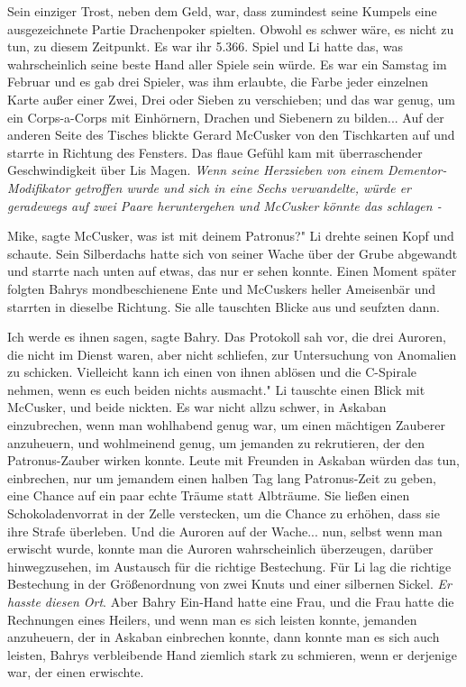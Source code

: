 Sein einziger Trost, neben dem Geld, war, dass zumindest seine Kumpels eine
ausgezeichnete Partie Drachenpoker spielten. Obwohl es schwer wäre, es nicht zu
tun, zu diesem Zeitpunkt. Es war ihr 5.366. Spiel und Li hatte das, was
wahrscheinlich seine beste Hand aller Spiele sein würde. Es war ein Samstag im
Februar und es gab drei Spieler, was ihm erlaubte, die Farbe jeder einzelnen
Karte außer einer Zwei, Drei oder Sieben zu verschieben; und das war genug, um
ein Corps-a-Corps mit Einhörnern, Drachen und Siebenern zu bilden... Auf der
anderen Seite des Tisches blickte Gerard McCusker von den Tischkarten auf und
starrte in Richtung des Fensters. Das flaue Gefühl kam mit überraschender
Geschwindigkeit über Lis Magen. \emph{Wenn seine Herzsieben von einem
Dementor-Modifikator getroffen wurde und sich in eine Sechs verwandelte, würde
er geradewegs auf zwei Paare heruntergehen und McCusker könnte das schlagen -}

\glqq{}Mike\grqq{}, sagte McCusker, \glqq{}was ist mit deinem Patronus?" Li drehte
seinen Kopf und schaute. Sein Silberdachs hatte sich von seiner Wache über der
Grube abgewandt und starrte nach unten auf etwas, das nur er sehen konnte. Einen
Moment später folgten Bahrys mondbeschienene Ente und McCuskers heller
Ameisenbär und starrten in dieselbe Richtung. Sie alle tauschten Blicke aus und
seufzten dann.

\glqq{}Ich werde es ihnen sagen,\grqq{} sagte Bahry. Das Protokoll sah vor, die
drei Auroren, die nicht im Dienst waren, aber nicht schliefen, zur Untersuchung
von Anomalien zu schicken. \glqq{}Vielleicht kann ich einen von ihnen ablösen und
die C-Spirale nehmen, wenn es euch beiden nichts ausmacht." Li tauschte einen
Blick mit McCusker, und beide nickten. Es war nicht allzu schwer, in Askaban
einzubrechen, wenn man wohlhabend genug war, um einen mächtigen Zauberer
anzuheuern, und wohlmeinend genug, um jemanden zu rekrutieren, der den
Patronus-Zauber wirken konnte. Leute mit Freunden in Askaban würden das tun,
einbrechen, nur um jemandem einen halben Tag lang Patronus-Zeit zu geben, eine
Chance auf ein paar echte Träume statt Albträume. Sie ließen einen
Schokoladenvorrat in der Zelle verstecken, um die Chance zu erhöhen, dass sie
ihre Strafe überleben. Und die Auroren auf der Wache... nun, selbst wenn man
erwischt wurde, konnte man die Auroren wahrscheinlich überzeugen, darüber
hinwegzusehen, im Austausch für die richtige Bestechung. Für Li lag die richtige
Bestechung in der Größenordnung von zwei Knuts und einer silbernen Sickel.
\emph{Er hasste diesen Ort}. Aber Bahry Ein-Hand hatte eine Frau, und die Frau
hatte die Rechnungen eines Heilers, und wenn man es sich leisten konnte,
jemanden anzuheuern, der in Askaban einbrechen konnte, dann konnte man es sich
auch leisten, Bahrys verbleibende Hand ziemlich stark zu schmieren, wenn er
derjenige war, der einen erwischte.

